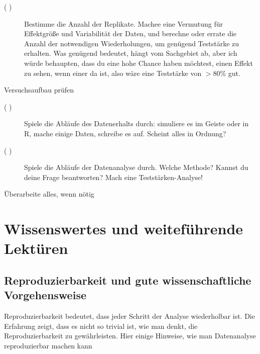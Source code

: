 \documentclass[a4paper,twoside]{tufte-book}\usepackage[]{graphicx}\usepackage[]{color}
\begin{document}
\begin{mdframed}
\begin{description}
\begin{description}
  \item[( )] Bestimme die Anzahl der Replikate. Machee eine Vermutung für Effektgröße und Variabilität der Daten, und berechne oder errate die Anzahl der notwendigen Wiederholungen, um genügend Teststärke zu erhalten. Was genügend bedeutet, hängt vom Sachgebiet ab, aber ich würde behaupten, dass du eine hohe Chance haben möchtest, einen Effekt zu sehen, wenn einer da ist, also wäre eine Teststärke von $>80\%$ gut.
  
  \end{description}
  
\item[( )] Versuchsaufbau prüfen
  
  \begin{description}
  
  \item[( )] Spiele die Abläufe des Datenerhalts durch: simuliere es im Geiste oder in R, mache einige Daten, schreibe es auf. Scheint alles in Ordnung?
  
  \item[( )] Spiele die Abläufe der Datenanalyse durch. Welche Methode? Kannst du deine Frage beantworten? Mach eine Teststärken-Analyse!

  \end{description}


\item[( )] Überarbeite alles, wenn nötig

\end{description}

\end{mdframed}


\chapter{Wissenswertes und weiteführende Lektüren}

\section{Reproduzierbarkeit und gute wissenschaftliche Vorgehensweise}

Reproduzierbarkeit bedeutet, dass jeder Schritt der Analyse wiederholbar ist. Die Erfahrung zeigt, dass es nicht so trivial ist, wie man denkt, die Reproduzierbarkeit zu gewährleisten. Hier einige Hinweise, wie man Datenanalyse reproduzierbar machen kann
\end{document}

